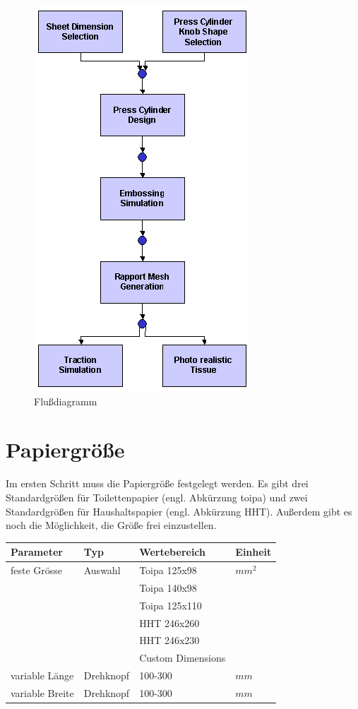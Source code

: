 \begin{figure}[!Hhtp]
  \begin{center}
   \includegraphics[scale=0.6]{process/flowchart_overview}
   \caption{Flu\ss diagramm}
  \end{center}
\end{figure}

\section{Papiergr\"o\ss e}
Im ersten Schritt muss die Papiergr\"o\ss e festgelegt werden. Es gibt drei
Standardgr\"o\ss en f\"ur Toilettenpapier (engl. Abk\"urzung toipa) und zwei 
Standardgr\"o\ss en f\"ur Haushaltspapier (engl. Abk\"urzung HHT). Au\ss erdem 
gibt es noch die M\"oglichkeit, die Gr\"o\ss e frei einzustellen.

\begin{tabular}{|l|l|l|l|} \hline
Parameter 		& Typ 		& Wertebereich 	& Einheit	\\ \hline
feste Gr\"osse 	& Auswahl 	& Toipa 125x98	& $mm^2$ 	\\ 
				& 		 	& Toipa 140x98	&			\\
				& 		 	& Toipa 125x110&			\\				
				& 			& HHT 246x260	& 			\\ 
			    &			& HHT 246x230	& 			\\ 
				& 			& Custom Dimensions		& 			\\ \hline
variable L\"ange	& Drehknopf	& 100-300 		& $mm$ 		\\ \hline
variable Breite& Drehknopf	& 100-300 		& $mm$ 		\\ \hline
\end{tabular}

